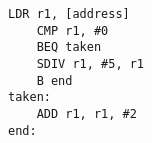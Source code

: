 \begin{lstlisting}[style=AsmStyle]    
    LDR r1, [address]
    CMP r1, #0
    BEQ taken
    SDIV r1, #5, r1
    B end
taken:
    ADD r1, r1, #2
end:
\end{lstlisting}